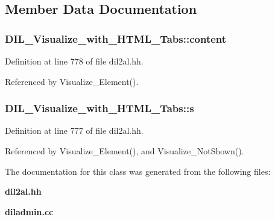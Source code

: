 \subsection{Member Data Documentation}
\subsubsection{ DIL\_\-Visualize\_\-with\_\-HTML\_\-Tabs::content\hspace{0.3cm}{\tt  [protected]}}\label{classDIL__Visualize__with__HTML__Tabs_n1}




Definition at line 778 of file dil2al.hh.

Referenced by Visualize\_\-Element().
\subsubsection{ DIL\_\-Visualize\_\-with\_\-HTML\_\-Tabs::s\hspace{0.3cm}{\tt  [protected]}}\label{classDIL__Visualize__with__HTML__Tabs_n0}




Definition at line 777 of file dil2al.hh.

Referenced by Visualize\_\-Element(), and Visualize\_\-Not\-Shown().

The documentation for this class was generated from the following files:\begin{CompactItemize}
\item 
{\bf dil2al.hh}\item 
{\bf diladmin.cc}\end{CompactItemize}
